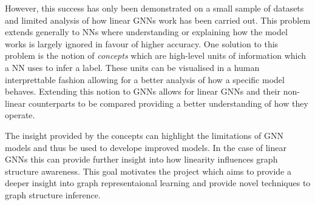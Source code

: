 However, this success has only been demonstrated on a small sample of datasets and limited analysis of how linear GNNs work has been carried out.
This problem extends generally to NNs where understanding or explaining how the model works is largely ignored in favour of higher accuracy.
One solution to this problem is the notion of \emph{concepts} which are high-level units of information which a NN uses to infer a label.
These units can be visualised in a human interprettable fashion allowing for a better analysis of how a specific model behaves.
Extending this notion to GNNs allows for linear GNNs and their non-linear counterparts to be compared providing a better understanding of how they operate.

The insight provided by the concepts can highlight the limitations of GNN models and thus be used to develope improved models.
In the case of linear GNNs this can provide further insight into how linearity influences graph structure awareness.
This goal motivates the project which aims to provide a deeper insight into graph representaional learning and provide novel techniques to graph structure inference.


